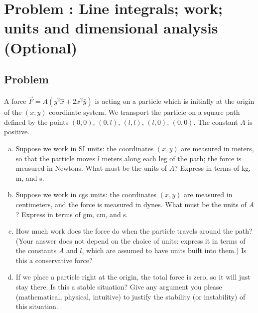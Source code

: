 \documentclass[solutions]{esg8022pset}
\date{\today }
\begin{document}
  \addtocounter{section}{-1}
\section{Problem \thesection: Line integrals; work; units and dimensional analysis (Optional)}
\subsection{Problem}
  A force ${\vec F} = A(y^2{\hat x} + 2x^2{\hat y})$ is acting on a
  particle which is initially at the origin of the $(x,y)$ coordinate
  system.  We transport the particle on a square path defined by the
  points $(0,0)$, $(0,l)$, $(l,l)$, $(l,0)$, $(0,0)$.  The constant $A$
  is positive.

  \begin{enumerate}[(a)]
    \item Suppose we work in SI units: the coordinates $(x,y)$ are measured
      in meters, so that the particle moves $l$ meters along each leg of the
      path; the force is measured in Newtons.  What must be the units of
      $A$?  Express in terms of kg, m, and s.
    \item Suppose we work in cgs units: the coordinates $(x,y)$ are measured
      in centimeters, and the force is measured in dynes.  What must be the
      units of $A$?  Express in terms of gm, cm, and s.
    \item How much work does the force do when the particle travels around
      the path?  (Your answer does not depend on the choice of units:
      express it in terms of the constants $A$ and $l$, which are assumed to
      have units built into them.)  Is this a conservative force?
    \item If we place a particle right at the origin, the total force is
      zero, so it will just stay there.  Is this a stable situation?  Give
      any argument you please (mathematical, physical, intuitive) to justify
      the stability (or instability) of this situation.
  \end{enumerate}
\end{document}
